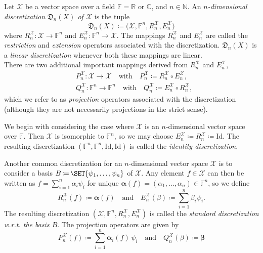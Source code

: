 \documentclass[a4paper]{paper}
\makeatletter
\newcommand*{\SPC}[1]{{\ensuremath{\mathscr{#1}}}}
\newcommand*{\SPCX}{\SPC{X}}
\newcommand{\FIELD}{{\ensuremath{\mathbb{F}}}}
\newcommand*{\Fn}{{\ensuremath{\FIELD^n}}}
\newcommand{\RR}{{\ensuremath{\mathbb{R}}}}
\newcommand{\CC}{{\ensuremath{\mathbb{C}}}}
\newcommand{\NN}{{\ensuremath{\mathbb{N}}}}
\newcommand*{\OP}[1]{{\ensuremath{\mathcal{#1}}}}
\newcommand*{\OPID}{\OP{\mathrm{Id}}}
\newcommand*{\EXT}[2]{\ensuremath{E_{#1}^{#2}}}
\newcommand*{\REST}[2]{\ensuremath{R_{#1}^{#2}}}
\newcommand*{\PROJ}[2]{\ensuremath{P_{#1}^{#2}}}
\newcommand*{\COPROJ}[2]{\ensuremath{Q_{#1}^{#2}}}
\newcommand*{\RnX}{{\ensuremath{\REST{n}{\SPC{X}}}}}
\newcommand*{\EnX}{{\ensuremath{\EXT{n}{\SPC{X}}}}}
\newcommand*{\PnX}{{\ensuremath{\PROJ{n}{\SPCX}}}}
\newcommand*{\QnX}{{\ensuremath{\COPROJ{n}{\SPCX}}}}
\newcommand*{\DISCR}[2]{{\ensuremath{\mathfrak{D}_{#2}(#1)}}}
\newcommand*{\DISCRnX}{\DISCR{X}{n}}
\DeclareMathOperator{\DEFEQ}{{\coloneqq}}
\newcommand{\wrt}{{w.r.t.}\@\xspace}
\newcommand{\valpha}{\boldsymbol{\alpha}}
\newcommand{\vbeta}{\boldsymbol{\beta}}
\makeatother
\begin{document}
\begin{definition}
 \label{def:discr:space:space_discr}
 Let $\SPCX$ be a vector space over a field $\FIELD = \RR \text{ or } \CC$, and $n \in \NN$.
 An \emph{$n$-dimensional discretization $\DISCRnX$ of $\SPCX$} is the tuple
 \begin{equation*}
  \DISCRnX \DEFEQ  \bigl( \SPCX, \Fn, \RnX, \EnX \bigr) 
 \end{equation*}
 where $\RnX \colon \SPCX \to \Fn$ and $\EnX \colon \Fn \to \SPCX$. The mappings $\RnX$ and $\EnX$ 
 are called the \emph{restriction} and \emph{extension} operators associated with the discretization. 
 $\DISCRnX$ is a \emph{linear discretization} whenever both these mappings are linear.\\
 There are two additional important mappings derived from $\RnX$ and $\EnX$,
 \begin{align*}
  & \PnX \colon \SPCX \to \SPCX \quad \text{with} \quad \PnX \DEFEQ  \RnX \circ \EnX, \\
  & \QnX \colon \Fn \to \Fn \quad \text{with} \quad \QnX \DEFEQ  \EnX \circ \RnX,
 \end{align*}
 which we refer to as \emph{projection} operators associated with the discretization (although they are not 
necessarily  projections in the strict sense).
\end{definition}

\begin{examp}
 We begin with considering the case where $\SPCX$ is an $n$-dimensional vector space over $\FIELD$. Then $\SPCX$ is 
 isomorphic to $\Fn$, so we may choose $\EnX \DEFEQ \RnX\DEFEQ \OPID$. The resulting discretization 
 $( \Fn, \Fn, \OPID, \OPID )$ is called 
 the \emph{identity discretization}. 
\end{examp}

\begin{examp}
 Another common discretization for an $n$-dimensional vector space $\SPCX$ is to consider a basis 
 $B\DEFEQ \SET{\psi_1,\dots, \psi_{n}}$ of $\SPCX$. Any element $f \in \SPCX$ can then be written as 
 $f = \sum_{i=1}^n \alpha_i \psi_i$ for unique $\valpha(f) = (\alpha_1, \dots, \alpha_{n})\in\Fn$, so we define
 \begin{equation*}
  \RnX(f) \DEFEQ  \valpha(f) \quad \text{and} \quad \EnX(\beta) \DEFEQ  \sum_{i=1}^n \beta_i \psi_i. 
 \end{equation*}
 The resulting discretization $( \SPCX, \Fn, \RnX, \EnX )$ is called the \emph{standard discretization \wrt 
 the basis $B$}. The projection operators are given by
 \begin{equation*}
  \PnX(f) \DEFEQ  \sum_{i=1}^n \valpha_i(f)\, \psi_i \quad \text{and} \quad \QnX(\beta) \DEFEQ  \vbeta
 \end{equation*}

\end{examp}
\end{document}
